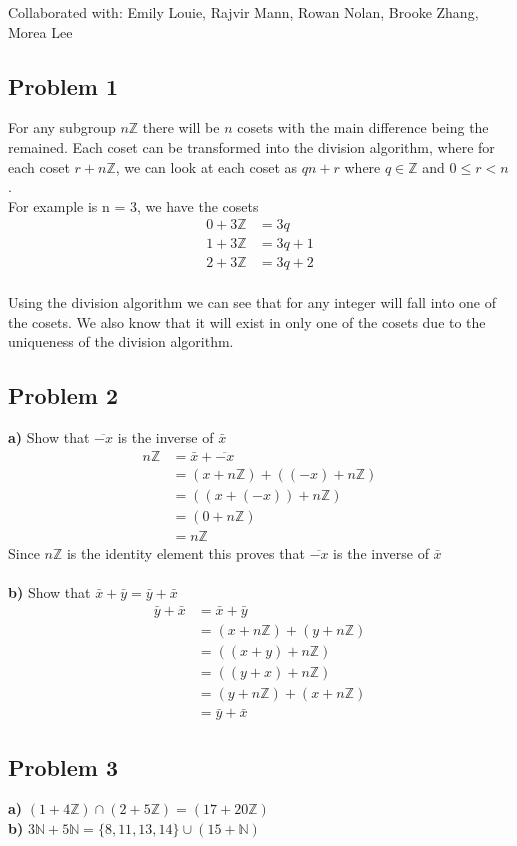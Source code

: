 \documentclass[12pt]{article}
\newcommand{\N}{\mathbb{N}}
\newcommand{\Z}{\mathbb{Z}}
\begin{document}
Collaborated with: Emily Louie, Rajvir Mann, Rowan Nolan, Brooke Zhang, Morea Lee

\subsection*{Problem 1}
For any subgroup $n\Z$ there will be $n$ cosets with the main difference being the remained. Each coset can be transformed into the division algorithm, where for each coset $r + n\Z$, we can look at each coset as $qn + r$ where $q \in \Z$ and $0 \leq r < n$.\\
For example is n = 3, we have the cosets
\begin{align*}
0 + 3\Z &= 3q\\
1 + 3\Z &= 3q + 1\\
2 + 3\Z &= 3q + 2
\end{align*}\\
Using the division algorithm we can see that for any integer will fall into one of the cosets. We also know that it will exist in only one of the cosets due to the uniqueness of the division algorithm.
\subsection*{Problem 2}
\textbf{a)}  Show that $\overline{-x}$ is the inverse of $\bar{x}$\\
\begin{align*}
n\Z &= \bar{x} + \overline{-x} \\
&= (x + n\Z) + ((-x)+n\Z) \\
&= ((x + (-x)) + n\Z) \\
&= (0 + n\Z) \\
&= n\Z
\end{align*}
Since $n\Z$ is the identity element this proves that $\overline{-x}$ is the inverse of $\bar{x}$ \\\\
\textbf{b)} Show that $\bar{x} + \bar{y} = \bar{y} + \bar{x}$ \\
\begin{align*}
\bar{y} + \bar{x} &= \bar{x} + \bar{y} \\
&= (x + n\Z) + (y + n\Z)\\
&= ((x + y) + n\Z)\\
&= ((y + x) + n\Z) \\
&= (y + n\Z) + (x + n\Z)\\
&= \bar{y} + \bar{x}
\end{align*}
\subsection*{Problem 3}
\textbf{a)} $(1 + 4\Z) \cap (2 + 5\Z) = (17 + 20\Z)$ \\
\textbf{b)} $3\N + 5\N = \{8,11,13,14\} \cup (15+\N)$
\newpage
\end{document}
